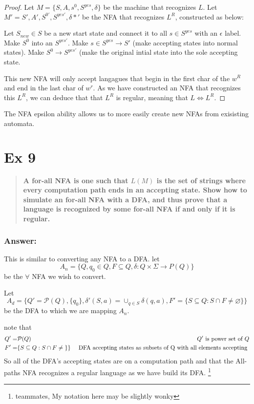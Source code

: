 \documentclass[titlepage]{article}\usepackage[]{graphicx}\usepackage[]{color}
\begin{document}
\begin{proof} 
	Let $M = \{S, A, s^0, S^{yes}, \delta\}$ be the machine that recognizes $L$.
	Let $M' = {S',A',S^{0'}, S^{yes'}, \delta*'}$ be the NFA that recognizes
	$L^R$, constructed as below:

	Let $S_{new} \in S$ be a new start state and connect it to all $s \in S^{yes}$
	with an $\epsilon$ label. 
	Make $S^0$ into an $S^{yes'}$. 
	Make $s \in S^{yes} \to S'$ (make accepting states into normal states).
	Make $S^{0} \to S^{yes'}$ (make the original intial state into the sole
	accepting state.

	This new NFA will only accept langagues that begin in the first char of the
	$w^R$ and end in the last char of $w^r$. As we have constructed an NFA that
	recognizes this $L^R$, we can deduce that that $L^R$ is regular, meaning
	that $L \Leftrightarrow L^R$.
\end{proof}

The NFA epsilon ability allows us to more easily create new NFAs from
exisisting automata.



\section*{Ex 9}
\begin{quote}
  \textbf{A for-all NFA is one such that $L(M)$ is the set of strings where every
  computation path ends in an accepting state. Show how to simulate an for-all
  NFA with a DFA, and thus prove that a language is recognized by some for-all
  NFA if and only if it is regular.}
\end{quote}

\subsubsection*{Answer:}
This is similar to converting any NFA to a DFA. 
let \[ A_n = \{ Q, q_0 \in Q, F \subseteq Q, \delta : Q \times \Sigma \to P(Q) \} \]
  be the $\forall$ NFA we wish to convert.

Let \[ A_d = \{Q' = \mathcal{P}(Q), \{ q_0 \}, \delta'(S,a) = \cup_{q \in S}
\delta(q,a), F' = \{ S \subseteq Q : S \cap F \neq \varnothing \} \} \]
be the DFA to which we are mapping $A_n$.

note that
\begin{align*}
  Q' =& \mathcal{P}(Q)& Q' \text{ is power set of } Q \\ 
  F' =& \{ S \subseteq Q : S \cap F \neq \null \} \} &\text{ DFA accepting states
  as subsets of Q with all elements accepting } 
\end{align*}
So all of the DFA's accepting states are on a computation path and that the
All-paths NFA recognizes a regular language as we have build its DFA.
\footnote{teammates, My notation here may be slightly wonky}
\end{document}
